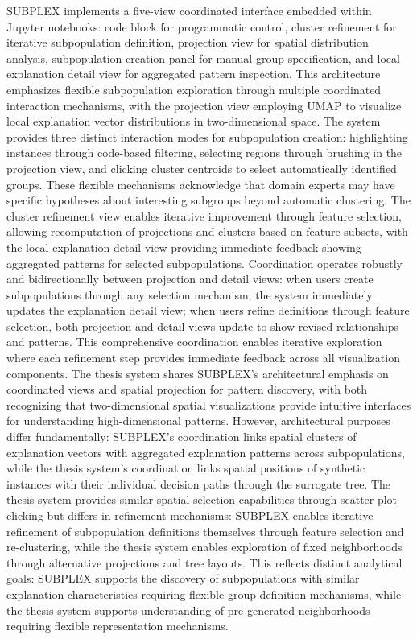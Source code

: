 SUBPLEX \cite{9861728} implements a five-view coordinated interface embedded within Jupyter notebooks: code block for programmatic control, cluster refinement for iterative subpopulation definition, projection view for spatial distribution analysis, subpopulation creation panel for manual group specification, and local explanation detail view for aggregated pattern inspection. This architecture emphasizes flexible subpopulation exploration through multiple coordinated interaction mechanisms, with the projection view employing UMAP to visualize local explanation vector distributions in two-dimensional space. The system provides three distinct interaction modes for subpopulation creation: highlighting instances through code-based filtering, selecting regions through brushing in the projection view, and clicking cluster centroids to select automatically identified groups. These flexible mechanisms acknowledge that domain experts may have specific hypotheses about interesting subgroups beyond automatic clustering. The cluster refinement view enables iterative improvement through feature selection, allowing recomputation of projections and clusters based on feature subsets, with the local explanation detail view providing immediate feedback showing aggregated patterns for selected subpopulations. Coordination operates robustly and bidirectionally between projection and detail views: when users create subpopulations through any selection mechanism, the system immediately updates the explanation detail view; when users refine definitions through feature selection, both projection and detail views update to show revised relationships and patterns. This comprehensive coordination enables iterative exploration where each refinement step provides immediate feedback across all visualization components. The thesis system shares SUBPLEX's architectural emphasis on coordinated views and spatial projection for pattern discovery, with both recognizing that two-dimensional spatial visualizations provide intuitive interfaces for understanding high-dimensional patterns. However, architectural purposes differ fundamentally: SUBPLEX's coordination links spatial clusters of explanation vectors with aggregated explanation patterns across subpopulations, while the thesis system's coordination links spatial positions of synthetic instances with their individual decision paths through the surrogate tree. The thesis system provides similar spatial selection capabilities through scatter plot clicking but differs in refinement mechanisms: SUBPLEX enables iterative refinement of subpopulation definitions themselves through feature selection and re-clustering, while the thesis system enables exploration of fixed neighborhoods through alternative projections and tree layouts. This reflects distinct analytical goals: SUBPLEX supports the discovery of subpopulations with similar explanation characteristics requiring flexible group definition mechanisms, while the thesis system supports understanding of pre-generated neighborhoods requiring flexible representation mechanisms.


